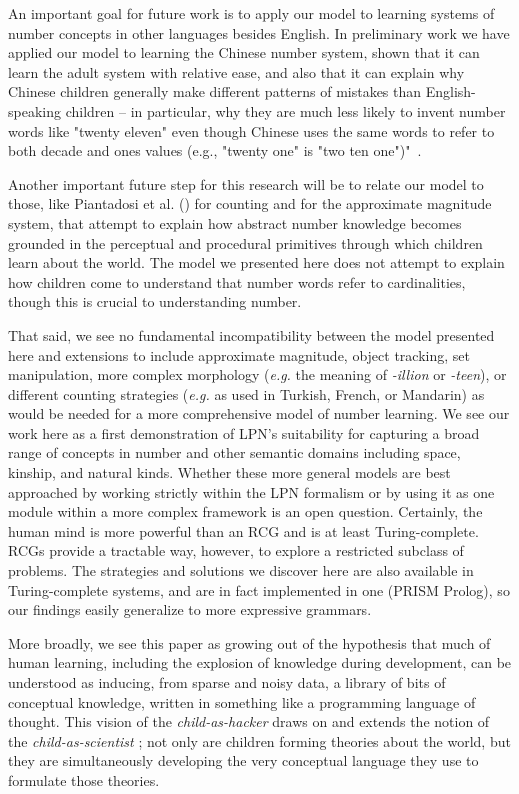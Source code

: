 \documentclass[10pt,letterpaper]{article}
\begin{document}
An important goal for future work is to apply our model to learning
systems of number concepts in other languages besides English.  In
preliminary work we have applied our model to learning the Chinese
number system, shown that it can learn the adult system with relative
ease, and also that it can explain why Chinese children generally make
different patterns of mistakes than English-speaking children -- in
particular, why they are much less likely to invent number words like
"twenty eleven" even though Chinese uses the same words to refer to
both decade and ones values (e.g., "twenty one" is "two ten one")"~\citep{miller1987counting}.

Another important future step for this research will be to relate our
model to those, like Piantadosi et al. (\citeyear{PianGoodTen2012})
for counting and \citet{dehaene2011number} for the approximate magnitude system,
that attempt to explain how abstract number knowledge becomes grounded
in the perceptual and procedural primitives through which children
learn about the world. The model we presented here does not attempt to
explain how children come to understand that number words refer to
cardinalities, though this is crucial to understanding number.

That said, we see no fundamental incompatibility between the model
presented here and extensions to include approximate magnitude, object
tracking, set manipulation, more complex morphology ({\it e.g.} the
meaning of \emph{-illion} or \emph{-teen}), or different counting
strategies ({\it e.g.} as used in Turkish, French, or Mandarin) as
would be needed for a more comprehensive model of number learning. We
see our work here as a first demonstration of LPN's suitability for
capturing a broad range of concepts in number and other semantic
domains including space, kinship, and natural kinds.  Whether these
more general models are best approached by working strictly within the
LPN formalism or by using it as one module within a more complex
framework is an open question. Certainly, the human mind is more
powerful than an RCG and is at least Turing-complete.  RCGs provide a
tractable way, however, to explore a restricted subclass of
problems. The strategies and solutions we discover here are also
available in Turing-complete systems, and are in fact implemented in
one (PRISM Prolog), so our findings easily generalize to more
expressive grammars.

More broadly, we see this paper as growing out of the hypothesis that
much of human learning, including the explosion of knowledge during
development, can be understood as inducing, from sparse and noisy data,
a library of bits of conceptual knowledge, written in something like a
programming language of thought. This vision of the
\emph{child-as-hacker} draws on and extends the notion of the
\emph{child-as-scientist} \citep{gopnik1996scientist}; not only are
children forming theories about the world, but they are simultaneously
developing the very conceptual language they use to formulate those
theories.
\end{document}

